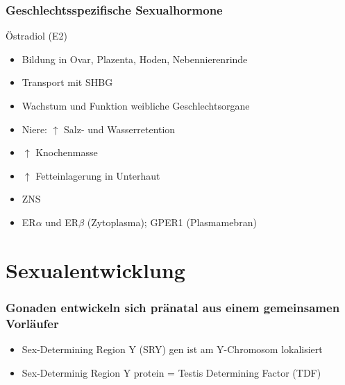 \documentclass{beamer}
\begin{document}
\begin{frame}
 \frametitle{Geschlechtsspezifische Sexualhormone}


\begin{block}{Östradiol (E2)}
\begin{itemize}
\item

Bildung in Ovar, Plazenta, Hoden, Nebennierenrinde
\item
Transport mit SHBG
\item
 Wachstum und Funktion weibliche Geschlechtsorgane
\item
Niere: \(\uparrow\) Salz- und Wasserretention
 \item
 \(\uparrow\) Knochenmasse
\item
 \(\uparrow\) Fetteinlagerung in Unterhaut
\item
 ZNS
\item
ER\(\alpha\) und ER\(\beta\) (Zytoplasma); GPER1 (Plasmamebran)


\end{itemize}
\end{block}

\end{frame}



\section{Sexualentwicklung}


\begin{frame}
\frametitle{Gonaden entwickeln sich pränatal aus einem gemeinsamen Vorläufer}


\begin{itemize}
    \item 
 Sex-Determining Region Y (SRY) gen ist am Y-Chromosom lokalisiert
 \item
 Sex-Determinig Region Y protein = Testis Determining Factor    (TDF)
    



\end{itemize}

\end{frame}
\end{document}

